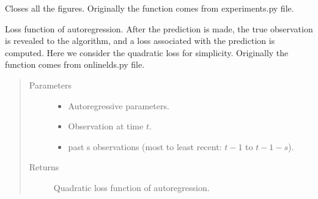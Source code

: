 \documentclass[letterpaper,10pt,english]{sphinxmanual}
\begin{document}

\begin{fulllineitems}
\label{\detokenize{LDS:LDS.OnlineLDS_library.close_all_figs}}
\sphinxAtStartPar
Closes all the figures. Originally the function comes from experiments.py file.

\end{fulllineitems}


\begin{fulllineitems}
\label{\detokenize{LDS:LDS.OnlineLDS_library.cost_ar}}
\sphinxAtStartPar
Loss function of auto\sphinxhyphen{}regression.
After the prediction is made, the true observation is revealed to
the algorithm, and a loss associated with the prediction is computed.
Here we consider the quadratic loss for simplicity.
Originally the function comes from onlinelds.py file.
\begin{quote}\begin{description}
\item[{Parameters}] \leavevmode\begin{itemize}
\item {} 
\sphinxAtStartPar
{} \textendash{} Auto\sphinxhyphen{}regressive parameters.

\item {} 
\sphinxAtStartPar
{}\sphinxstyleliteralstrong{\sphinxupquote{{[}}}\sphinxstyleliteralstrong{\sphinxupquote{{]}}} \textendash{} Observation at time \(t\).

\item {} 
\sphinxAtStartPar
{}\sphinxstyleliteralstrong{\sphinxupquote{{[}}}\sphinxstyleliteralstrong{\sphinxupquote{{]}}} \textendash{} past s observations (most to least recent: \(t-1\) to \(t-1-s\)).

\end{itemize}

\item[{Returns}] \leavevmode
\sphinxAtStartPar
Quadratic loss function of auto\sphinxhyphen{}regression.

\end{description}\end{quote}

\end{fulllineitems}
\end{document}
